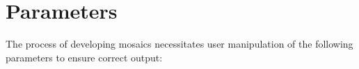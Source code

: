 \newcommand{\paritem}[4]{
  \pbodyitem{#1}{
    \index{#1}
    \textbf{Domain:}{#3} \newline
    \textbf{Notated:}{#4} \newline
    {#2}
  }
}

\newcommand{\FontParSymbol}{\(F\)}
\newcommand{\SrcImgParSymbol}{\(SI\)}
\newcommand{\SrcTxtParSymbol}{\(ST\)}
\newcommand{\RegMskParSymbol}{\(M_r\)}
\newcommand{\GlyphPathKernelParSymbol}{\(PK_r\)}
\newcommand{\GtrHtParSymbol}{\(GH_r\)}
\newcommand{\LnHtParSymbol}{\(LH_r\)}
\newcommand{\GlyphKrnParSymbol}{\(GK_r\)}
\newcommand{\GlyphSzMinParSymbol}{\(GSM_r\)}
\newcommand{\GlyphSzMaxParSymbol}{\(GSX_r\)}
\newcommand{\DnsSampleParSymbol}{\(DS_r\)}
\newcommand{\GlyphRotParSymbol}{\(GRS_r\)}
\newcommand{\PathGenSclParSymbol}{\(PS_r\)}


\section{Parameters}
\label{apx:userparams}
The process of developing mosaics necessitates user manipulation of the following parameters to ensure correct output:
